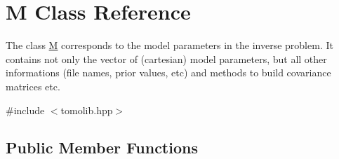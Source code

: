 \hypertarget{class_m}{}\section{M Class Reference}
\label{class_m}


The class \hyperlink{class_m}{M} corresponds to the model parameters in the inverse problem. It contains not only the vector of (cartesian) model parameters, but all other informations (file names, prior values, etc) and methods to build covariance matrices etc.  




{\ttfamily \#include $<$tomolib.\+hpp$>$}

\subsection*{Public Member Functions}
